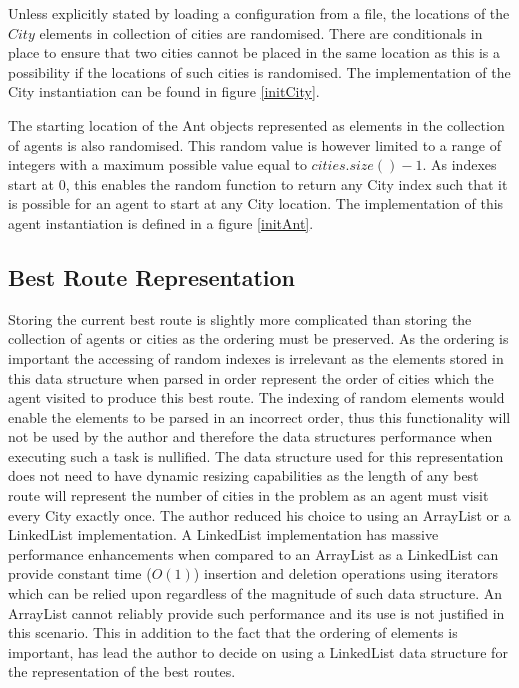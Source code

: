 Unless explicitly stated by loading a configuration from a file, the locations of the $City$ elements in collection of cities are randomised. There are conditionals in place to ensure that two cities cannot be placed in the same location as this is a possibility if the locations of such cities is randomised. The implementation of the City instantiation can be found in figure \ref{initCity}.

The starting location of the Ant objects represented as elements in the collection of agents is also randomised. This random value is however limited to a range of integers with a maximum possible value equal to $cities.size() - 1$. As indexes start at 0, this enables the random function to return any City index such that it is possible for an agent to start at any City location. The implementation of this agent instantiation is defined in a figure \ref{initAnt}.

\subsection{Best Route Representation}
\label{bestrtoutey}
Storing the current best route is slightly more complicated than storing the collection of agents or cities as the ordering must be preserved. As the ordering is important the accessing of random indexes is irrelevant as the elements stored in this data structure when parsed in order represent the order of cities which the agent visited to produce this best route. The indexing of random elements would enable the elements to be parsed in an incorrect order, thus this functionality will not be used by the author and therefore the data structures performance when executing such a task is nullified. The data structure used for this representation does not need to have dynamic resizing capabilities as the length of any best route will represent the number of cities in the problem as an agent must visit every City exactly once. The author reduced his choice to using an ArrayList or a LinkedList implementation. A LinkedList implementation has massive performance enhancements when compared to an ArrayList as a LinkedList can provide constant time ($O(1)$) insertion and deletion operations using iterators which can be relied upon regardless of the magnitude of such data structure. An ArrayList cannot reliably provide such performance and its use is not justified in this scenario. This in addition to the fact that the ordering of elements is important, has lead the author to decide on using a LinkedList data structure for the representation of the best routes.

